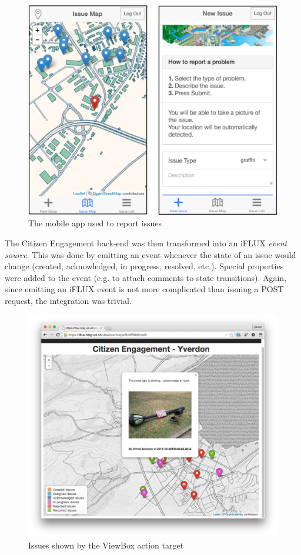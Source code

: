 \begin{figure}
\centering
\includegraphics[width=0.8\columnwidth]{figures/citizen-mobile.pdf}
\caption{The mobile app used to report issues}
\label{fig:citizenMobile}
\end{figure}


The Citizen Engagement back-end was then transformed into an iFLUX \emph{event source}. This was done by emitting an event whenever the state of an issue would change (created, acknowledged, in progress, resolved, etc.). Special properties were added to the event (e.g. to attach comments to state transitions). Again, since emitting an iFLUX event is not more complicated than issuing a POST request, the integration was trivial. 

\begin{figure}
\centering
\includegraphics[width=0.9\columnwidth]{figures/citizen-viewbox.png}
\caption{Issues shown by the ViewBox action target}
\label{fig:citizenMap}
\end{figure}

